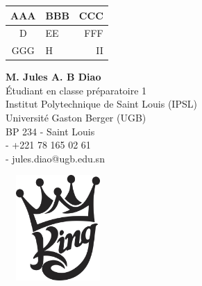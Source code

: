 \documentclass[12pt,a4paper]{article}
\begin{document}
\begin{tabular}{|c|p{2cm}|r|}
\hline
 AAA & BBB & CCC\\
\hline
D & EE & FFF\\
\hline
 GGG & H & II\\
 \hline
\end{tabular}
\newpage
\begin{minipage}[t]{0.5\textwidth}
{\bfseries \small M. Jules A. B Diao}\\[.45ex]
{\small Étudiant en classe préparatoire 1}\\
{\small Institut Polytechnique de Saint Louis (IPSL)}\\
{\small Université Gaston Berger (UGB)}\\
{\small BP 234 - Saint Louis}\\[.45ex]
\Telefon- +221 78 165 02 61\\%
\Letter- jules.diao@ugb.edu.sn\\
\end{minipage} \hspace{0.2cm}
\begin{minipage}[t]{0.5\textwidth}
\includegraphics[height=4cm,width=4cm]{king.png}
\lipsum[1]
\lipsum[2]
\end{minipage}
\end{document}
